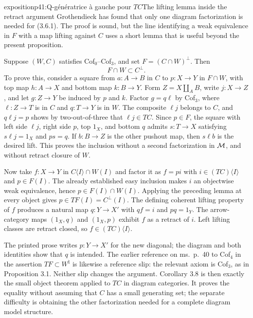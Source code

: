 \begin{dcomment}{exposition}{p41:Q-génératrice à gauche pour $TC$}{The lifting lemma inside the retract argument}
Grothendieck has found that only one diagram factorization is needed for (3.6.1). The proof is sound, but the line identifying a weak equivalence in $F$ with a map lifting against $C$ uses a short lemma that is useful beyond the present proposition.

Suppose $(W,C)$ satisfies Cof$_0$--Cof$_3$, and set $F=(C\cap W)^\perp$. Then
\[
 F\cap W\subset C^\perp.
\]
To prove this, consider a square from $a:A\to B$ in $C$ to $p:X\to Y$ in $F\cap W$, with top map $h:A\to X$ and bottom map $k:B\to Y$. Form $Z=X\amalg_A B$, write $j:X\to Z$, and let $g:Z\to Y$ be induced by $p$ and $k$. Factor $g=q\ell$ by Cof$_3$, where $\ell:Z\to T$ is in $C$ and $q:T\to Y$ is in $W$. The composite $\ell j$ belongs to $C$, and $q\ell j=p$ shows by two-out-of-three that $\ell j\in TC$. Since $p\in F$, the square with left side $\ell j$, right side $p$, top $1_X$, and bottom $q$ admits $s:T\to X$ satisfying $s\ell j=1_X$ and $ps=q$. If $b:B\to Z$ is the other pushout map, then $s\ell b$ is the desired lift. This proves the inclusion without a second factorization in $\mathcal{M}$, and without retract closure of $W$.

Now take $f:X\to Y$ in $C\langle I\rangle\cap W(I)$ and factor it as $f=pi$ with $i\in(TC)\langle I\rangle$ and $p\in F(I)$. The already established easy inclusion makes $i$ an objectwise weak equivalence, hence $p\in F(I)\cap W(I)$. Applying the preceding lemma at every object gives $p\in TF(I)=C^\perp(I)$. The defining coherent lifting property of $f$ produces a natural map $q:Y\to X'$ with $qf=i$ and $pq=1_Y$. The arrow-category maps $(1_X,q)$ and $(1_X,p)$ exhibit $f$ as a retract of $i$. Left lifting classes are retract closed, so $f\in(TC)\langle I\rangle$.

The printed prose writes $p:Y\to X'$ for the new diagonal; the diagram and both identities show that $q$ is intended. The earlier reference on ms.~p.~40 to Cof$_4$ in the assertion $TF\subset W^{\natural}$ is likewise a reference slip: the relevant axiom is Cof$_3$, as in Proposition 3.1. Neither slip changes the argument. Corollary 3.8 is then exactly the small object theorem applied to $TC$ in diagram categories. It proves the equality without assuming that $C$ has a small generating set; the separate difficulty is obtaining the other factorization needed for a complete diagram model structure.
\end{dcomment}


